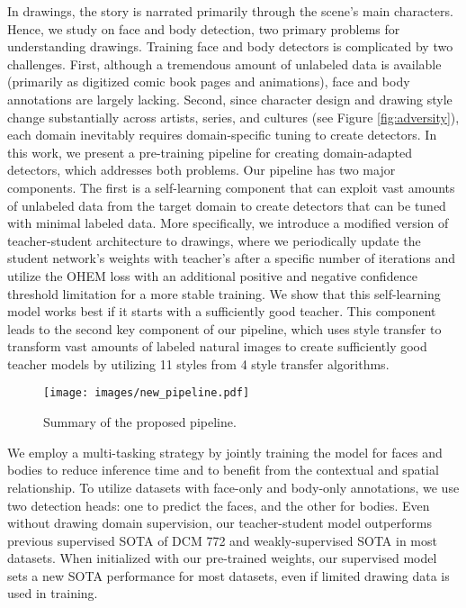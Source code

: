 \documentclass{article}
\begin{document}
In drawings, the story is narrated primarily through the scene's main characters. Hence, we study on face and body detection, two primary problems for understanding drawings. Training face and body detectors is complicated by two challenges. First, although a tremendous amount of unlabeled data is available (primarily as digitized comic book pages and animations), face and body annotations are largely lacking. Second, since character design and drawing style change substantially across artists, series, and cultures (see Figure \ref{fig:adversity}), each domain inevitably requires domain-specific tuning to create detectors. In this work, we present a pre-training pipeline for creating domain-adapted detectors, which addresses both problems. Our pipeline has two major components. The first is a self-learning component that can exploit vast amounts of unlabeled data from the target domain to create detectors that can be tuned with minimal labeled data. More specifically, we introduce a modified version of teacher-student architecture to drawings, where we periodically update the student network's weights with teacher's after a specific number of iterations and utilize the OHEM \cite{shrivastava2016training} loss with an additional positive and negative confidence threshold limitation for a more stable training.  We show that this self-learning model works best if it starts with a sufficiently good teacher. This component leads to the second key component of our pipeline, which uses style transfer to transform vast amounts of labeled natural images to create sufficiently good teacher models by utilizing 11 styles from 4 style transfer algorithms.

\begin{figure*}[ht]
    \centering
    \texttt{[image: images/new\_pipeline.pdf]}
    \caption{Summary of the proposed pipeline.}
    \label{fig:complete_pipeline}
\end{figure*}

We employ a multi-tasking strategy by jointly training the model for faces and bodies to reduce inference time and to benefit from the contextual and spatial relationship. To utilize datasets with face-only and body-only annotations, we use two detection heads: one to predict the faces, and the other for bodies. Even without drawing domain supervision, our teacher-student model outperforms previous supervised SOTA of DCM 772 \cite{jimaging4070089} and weakly-supervised SOTA \cite{inoue2018crossdomain} in most datasets. When initialized with our pre-trained weights, our supervised model sets a new SOTA performance for most datasets, even if limited drawing data is used in training.
\end{document}
